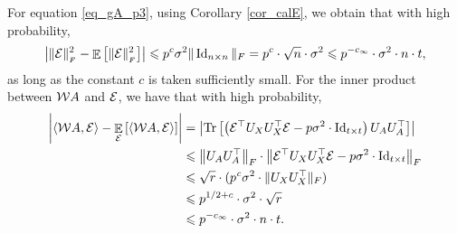 	For equation \eqref{eq_gA_p3}, using Corollary \ref{cor_calE},
	we obtain that with high probability,
	\begin{align}
		\left\lvert\|\mathcal{E}\|_{_{F}}^2 - \mathop{\mathbb{E}}\left[ \|\mathcal{E}\|_{_{F}}^2 \right]\right\rvert \leqslant p^{c} \sigma^2 \| \operatorname{Id}_{n\times n}\|_F = p^{c} \cdot \sqrt{n} \cdot \sigma^2 \leqslant p^{-c_{\infty}} \cdot \sigma^2 \cdot n \cdot t, \label{eq_gA_err3}
	\end{align}
	as long as the constant $c$ is taken sufficiently small. 
	For the inner product between ${\mathcal W} A$ and $\mathcal{E}$, we have that with high probability,
	\begin{align}
		{\left| {\langle {\mathcal W}A, \mathcal{E}\rangle - \mathop{\mathbb{E}}_{\mathcal{E}}\left[ \langle {\mathcal W}A, \mathcal{E}\rangle \right] } \right|} &= {\left| {\operatorname{Tr}\left[\left(\mathcal{E}^\top U_X U_X^{\top}\mathcal{E}  - p\sigma^2 \cdot  \operatorname{Id}_{t\times t} \right)  U_AU_A^{\top} \right]} \right|} \nonumber  \\
		&\leqslant \left\| U_{A} U_A^{\top} \right\|_{F} \cdot \left\| \mathcal{E}^\top U_X U_X^{\top} \mathcal{E} - p \sigma^2 \cdot  \operatorname{Id}_{t\times t} \right\|_{F} \nonumber \\
		&\leqslant \sqrt{r} \cdot (p^{{\mathit{c}}}\sigma^2\cdot \|U_X U_X^\top\|_F) \nonumber \\
		&\leqslant p^{1/2+c} \cdot \sigma^2 \cdot \sqrt{r} \nonumber\\
		& \leqslant  p^{-c_{\infty}} \cdot \sigma^2 \cdot n \cdot t .\label{eq_gA_err4}
	\end{align}

